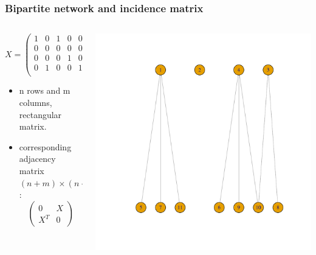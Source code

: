 \documentclass[nopagenumber,9pt]{beamer}
\begin{document}
\begin{frame}
\frametitle{Bipartite network and incidence matrix}
 \begin{columns}
 \begin{column}{.45\paperwidth}
$$X=\left(
\begin{array}{rrrrrrr}
1 &   0 &   1 &   0 &   0 &   0 &   1 \\ 
0 &   0 &   0 &   0 &   0 &   0 &   0 \\ 
0 &   0 &   0 &   1 &   0 &   1 &   0 \\ 
0 &   1 &   0 &   0 &   1 &   1 &   0 \\ \end{array}\right)
$$


\begin{itemize}
 \item n rows and m columns, rectangular matrix.
 \item corresponding adjacency matrix $(n+m)\times(n+m)$:
 $$
 \left(
 \begin{array}{rr}
  0 & X\\
  X^T & 0
 \end{array}
 \right)
 $$
\end{itemize}



\end{column}

\begin{column}{.5\paperwidth}

\includegraphics[scale=.3]{plots/graphe_bipartite.pdf}

\end{column}

\end{columns}



\end{frame}
\end{document}
